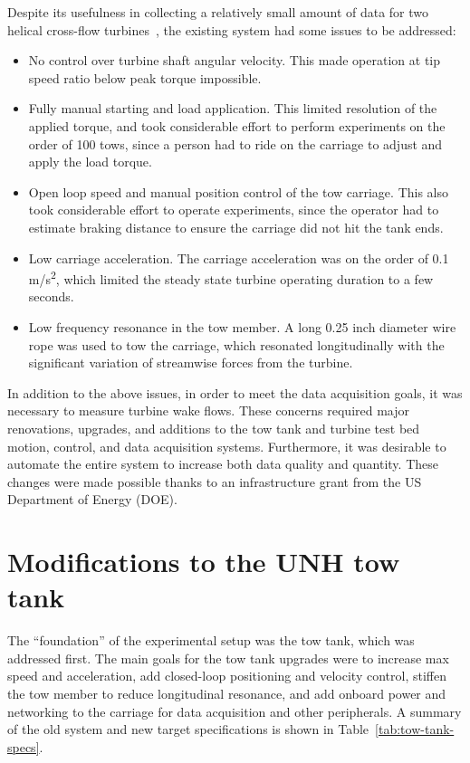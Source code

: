 Despite its usefulness in collecting a relatively small amount of data for two
helical cross-flow turbines~\cite{Bachant2015-RE}, the existing system had some
issues to be addressed:
\begin{itemize}
    \item No control over turbine shaft angular velocity. This made operation at
    tip speed ratio below peak torque impossible.
    
    \item Fully manual starting and load application. This limited resolution of
    the applied torque, and took considerable effort to perform experiments on
    the order of 100 tows, since a person had to ride on the carriage to adjust
    and apply the load torque.
    
    \item Open loop speed and manual position control of the tow carriage. This
    also took considerable effort to operate experiments, since the operator had
    to estimate braking distance to ensure the carriage did not hit the tank
    ends.
    
    \item Low carriage acceleration. The carriage acceleration was on the order
    of 0.1 m/s\textsuperscript{2}, which limited the steady state turbine
    operating duration to a few seconds.
    
    \item Low frequency resonance in the tow member. A long 0.25 inch diameter
    wire rope was used to tow the carriage, which resonated longitudinally with
    the significant variation of streamwise forces from the turbine.
\end{itemize}

In addition to the above issues, in order to meet the data acquisition goals, it
was necessary to measure turbine wake flows. These concerns required major
renovations, upgrades, and additions to the tow tank and turbine test bed
motion, control, and data acquisition systems. Furthermore, it was desirable to
automate the entire system to increase both data quality and quantity. These
changes were made possible thanks to an infrastructure grant from the US
Department of Energy (DOE).


\section{Modifications to the UNH tow tank}

The ``foundation'' of the experimental setup was the tow tank, which was
addressed first. The main goals for the tow tank upgrades were to increase max
speed and acceleration, add closed-loop positioning and velocity control,
stiffen the tow member to reduce longitudinal resonance, and add onboard power
and networking to the carriage for data acquisition and other peripherals. A
summary of the old system and new target specifications is shown in
Table~\ref{tab:tow-tank-specs}.

